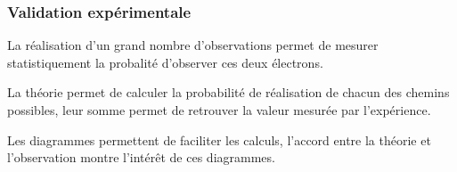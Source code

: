 \subsubsection{Validation expérimentale}


La réalisation d'un grand nombre d'observations permet de mesurer statistiquement la probalité d'observer ces deux électrons.

La théorie permet de calculer la probabilité de réalisation de chacun des chemins possibles, leur somme permet de retrouver la valeur mesurée par l'expérience.

Les diagrammes permettent de faciliter les calculs, l'accord entre la théorie et l'observation montre l'intérêt de ces diagrammes.


